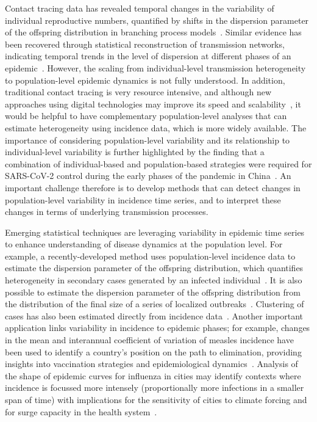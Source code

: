 \documentclass[11pt,letterpaper]{article}
\begin{document}
\begin{Abstract}
Contact tracing data has revealed temporal changes in the variability of individual reproductive numbers, quantified by shifts in the dispersion parameter of the offspring distribution in branching process models~\citep{guo2023statistical,ko2023time}. 
Similar evidence has been recovered through statistical reconstruction of transmission networks, indicating temporal trends in the level of dispersion at different phases of an epidemic~\citep{lau2017spatial}.
However, the scaling from individual-level transmission heterogeneity to population-level epidemic dynamics is not fully understood.
In addition, traditional contact tracing is very resource intensive, and although new approaches using digital technologies may improve its speed and scalability~\citep{kretzschmar2020impact}, it would be helpful to have complementary population-level analyses that can estimate heterogeneity using incidence data, which is more widely available.
The importance of considering population-level variability and its relationship to individual-level variability is further highlighted by the finding that a combination of individual-based and population-based strategies were required for SARS-CoV-2 control during the early phases of the pandemic in China~\citep{sun2021transmission}. 
An important challenge therefore is to develop methods that can detect changes in population-level variability in incidence time series, and to interpret these changes in terms of underlying transmission processes.

Emerging statistical techniques are leveraging variability in epidemic time series to enhance understanding of disease dynamics at the population level. 
For example, a recently-developed method uses population-level incidence data to estimate the dispersion parameter of the offspring distribution, which quantifies heterogeneity in secondary cases generated by an infected individual~\citep{kirkegaard2021superspreading}. 
It is also possible to estimate the dispersion parameter of the offspring distribution from the distribution of the final size of a series of localized outbreaks~\citep{blumberg2013inference}.
Clustering of cases has also been estimated directly from incidence data~\citep{schneckenreither2023assessing}.
Another important application links variability in incidence to epidemic phases; for example, changes in the mean and interannual coefficient of variation of measles incidence have been used to identify a country’s position on the path to elimination, providing insights into vaccination strategies and epidemiological dynamics~\citep{graham2019measles}. 
Analysis of the shape of epidemic curves for influenza in cities may identify contexts where incidence is focussed more intensely (proportionally more infections in a smaller span of time) with implications for the sensitivity of cities to climate forcing and for surge capacity in the health system~\citep{dalziel2018urbanization, wallinga2018metropolitan}. 


\end{Abstract}
\end{document}
